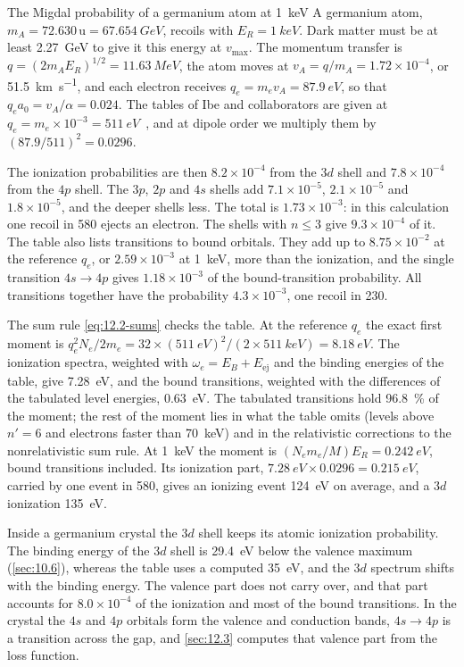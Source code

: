 \begin{workedexample}{The Migdal probability of a germanium atom at \SI{1}{keV}}\label{we:12-germanium}
A germanium atom, $m_A = 72.630\,\mathrm{u} = \SI{67.654}{GeV}$, recoils with $E_R = \SI{1}{keV}$. Dark matter must be at least \SI{2.27}{GeV} to give it this energy at $v_{\mathrm{max}}$. The momentum transfer is $q = (2m_AE_R)^{1/2} = \SI{11.63}{MeV}$, the atom moves at $v_A = q/m_A = 1.72\times10^{-4}$, or \SI{51.5}{km.s^{-1}}, and each electron receives $q_e = m_ev_A = \SI{87.9}{eV}$, so that $q_ea_0 = v_A/\alpha = 0.024$. The tables of Ibe and collaborators are given at $q_e = m_e\times10^{-3} = \SI{511}{eV}$~\cite[Table~II]{ibe2018migdal}, and at dipole order we multiply them by $(87.9/511)^2 = 0.0296$.

The ionization probabilities are then $8.2\times10^{-4}$ from the $3d$ shell and $7.8\times10^{-4}$ from the $4p$ shell. The $3p$, $2p$ and $4s$ shells add $7.1\times10^{-5}$, $2.1\times10^{-5}$ and $1.8\times10^{-5}$, and the deeper shells less. The total is $1.73\times10^{-3}$: in this calculation one recoil in 580 ejects an electron. The shells with $n \le 3$ give $9.3\times10^{-4}$ of it. The table also lists transitions to bound orbitals. They add up to $8.75\times10^{-2}$ at the reference $q_e$, or $2.59\times10^{-3}$ at \SI{1}{keV}, more than the ionization, and the single transition $4s \to 4p$ gives $1.18\times10^{-3}$ of the bound-transition probability. All transitions together have the probability $4.3\times10^{-3}$, one recoil in 230.

The sum rule \cref{eq:12.2-sums} checks the table. At the reference $q_e$ the exact first moment is $q_e^2N_e/2m_e = 32\times(\SI{511}{eV})^2/(2\times\SI{511}{keV}) = \SI{8.18}{eV}$. The ionization spectra, weighted with $\omega_e = E_B + E_{\mathrm{ej}}$ and the binding energies of the table, give \SI{7.28}{eV}, and the bound transitions, weighted with the differences of the tabulated level energies, \SI{0.63}{eV}. The tabulated transitions hold \SI{96.8}{\percent} of the moment; the rest of the moment lies in what the table omits (levels above $n' = 6$ and electrons faster than \SI{70}{keV}) and in the relativistic corrections to the nonrelativistic sum rule. At \SI{1}{keV} the moment is $(N_em_e/M)E_R = \SI{0.242}{eV}$, bound transitions included. Its ionization part, $\SI{7.28}{eV}\times0.0296 = \SI{0.215}{eV}$, carried by one event in 580, gives an ionizing event \SI{124}{eV} on average, and a $3d$ ionization \SI{135}{eV}.

Inside a germanium crystal the $3d$ shell keeps its atomic ionization probability. The binding energy of the $3d$ shell is \SI{29.4}{eV} below the valence maximum (\cref{sec:10.6}), whereas the table uses a computed \SI{35}{eV}, and the $3d$ spectrum shifts with the binding energy. The valence part does not carry over, and that part accounts for $8.0\times10^{-4}$ of the ionization and most of the bound transitions. In the crystal the $4s$ and $4p$ orbitals form the valence and conduction bands, $4s \to 4p$ is a transition across the gap, and \cref{sec:12.3} computes that valence part from the loss function.
\end{workedexample}

